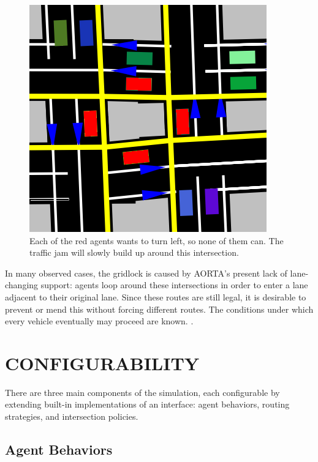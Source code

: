 \documentclass[letterpaper, 10 pt, conference]{ieeeconf}  %
\begin{document}
\begin{figure}[h]
  \centering \includegraphics[scale=0.25]{gridlock.png}
  \caption{Each of the red agents wants to turn left, so none of them
           can. The traffic jam will slowly build up around this intersection.}
  \label{fig:gridlock}
  \vspace{-10pt}
\end{figure}

In many observed cases, the gridlock is caused by AORTA's present lack of
lane-changing support: agents loop around these intersections in order to enter
a lane adjacent to their original lane. Since these routes are still legal, it
is desirable to prevent or mend this without forcing different routes. The
conditions under which every vehicle eventually may proceed are known.
\cite{AAAI11-au}.


\section{CONFIGURABILITY}
\label{sec:config}

There are three main components of the simulation, each configurable by
extending built-in implementations of an interface: agent behaviors, routing
strategies, and intersection policies.

\subsection{Agent Behaviors}
\end{document}
